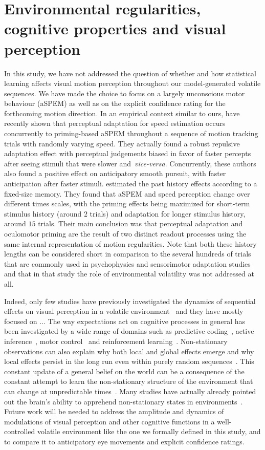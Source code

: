 \documentclass[12pt,english]{article}%
\newcommand{\citep}[1]{\parencite{#1}}
\newcommand{\citet}[1]{\textcite{#1}}
\begin{document}
\section{Environmental regularities, cognitive properties and visual perception}
In this study, we have not addressed the question of whether and how statistical learning affects visual motion perception throughout our model-generated volatile sequences. We have made the choice to focus on a largely unconscious motor behaviour (aSPEM) as well as on the explicit confidence rating for the forthcoming motion direction.
In an empirical context similar to ours, \citet{Maus2015} have recently shown that
perceptual adaptation for speed estimation occurs concurrently to
priming-based aSPEM throughout a sequence of motion tracking trials with randomly varying speed. They actually found a robust repulsive adaptation effect
with perceptual judgements biased in favor of faster percepts
after seeing stimuli that were slower and~\textit{vice-versa}.
Concurrently, these authors also found
a positive effect on anticipatory smooth pursuit,
with faster anticipation after faster stimuli.
\citet{Maus2015} estimated the past history effects according to a fixed-size memory. They found that aSPEM and speed perception change over different times scales,
with the priming effects being maximized
for short-term stimulus history (around $2$ trials) and
adaptation for longer stimulus history, around $15$ trials.
Their main conclusion was that
perceptual adaptation and oculomotor priming
are the result of two distinct readout processes
using the same internal representation of motion regularities.
Note that both these history lengths can be considered
short in comparison to the several hundreds
of trials that are commonly used in psychophysics and sensorimotor adaptation studies and that in that study the role of environmental volatility was not addressed at all.

Indeed, only few studies have previously investigated the dynamics of sequential effects on visual perception in a volatile environment~\citep{Fiser ? ChopinMamassian Meyniel} and they have mostly focused on ...
The way expectations act on cognitive processes  in general has been investigated by a wide range of domains such as predictive coding~\citep{Wolpert2000, Wacongne2012}, active inference~\citep{Friston2010}, motor control~\citep{Sutton1998, Behrens07} and reinforcement learning~\citep{Nassar2012}. Non-stationary observations can also explain why both local and global effects emerge and why local effects persist in the long run even within purely random sequences~\citep{Cho2002, Yu2009}. This constant update of a general belief on the world can be a consequence of the constant attempt to learn the non-stationary structure of the environment that can change at unpredictable times~\citep{Yu2009}. Many studies have actually already pointed out the brain's ability to apprehend non-stationary states in environments~\citep{Ossmy2013, Meyniel15}.
Future work will be needed to address the amplitude and dynamics of modulations of visual perception and other cognitive functions in a well-controlled volatile environment like the one we formally defined in this study, and to compare it to anticipatory eye movements and explicit confidence ratings.
\end{document}

